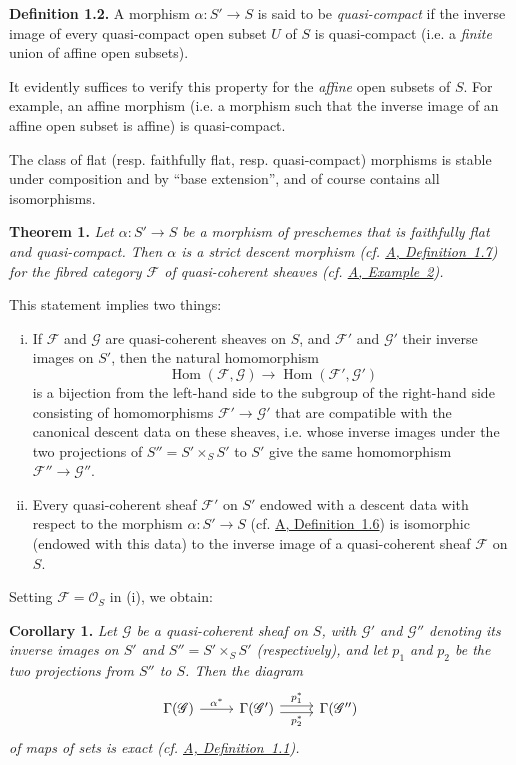 \documentclass{article}
\newenvironment{itenv}[1]
  {\phantomsection\par\medskip\noindent\textbf{#1.}\itshape}
  {\medskip}
\newenvironment{rmenv}[1]
  {\phantomsection\par\medskip\noindent\textbf{#1.}\rmfamily}
  {\medskip}
\newcommand{\scr}[1]{{\mathscr{#1}}}
\renewcommand{\cal}[1]{{\mathcal{#1}}}
\DeclareMathOperator{\Hom}{Hom}
\newcommand{\oldpage}[1]{\marginpar{\footnotesize$\Big\vert$ \textit{p.~#1}}}
\begin{document}
\begin{rmenv}{Definition 1.2}
  A morphism $\alpha\colon S'\to S$ is said to be \emph{quasi-compact} if the inverse image of every quasi-compact open subset $U$ of $S$ is quasi-compact (i.e. a \emph{finite} union of affine open subsets).
\end{rmenv}

It evidently suffices to verify this property for the \emph{affine} open subsets of $S$.
For example, an affine morphism (i.e. a morphism such that the inverse image of an affine open subset is affine) is quasi-compact.

The class of flat (resp. faithfully flat, resp. quasi-compact) morphisms is stable under composition and by ``base extension'', and of course contains all isomorphisms.

\begin{itenv}{Theorem 1}
\label{theorem:B.1(1)}
  Let $\alpha\colon S'\to S$ be a morphism of preschemes that is \emph{faithfully flat} and \emph{quasi-compact}.
  Then $\alpha$ is a \emph{strict descent morphism} (cf. \hyperref[definition:A.1.7]{A, Definition~1.7}) for the fibred category $\cal{F}$ of quasi-coherent sheaves (cf. \hyperref[example:A.1.1(2)]{A, Example~2}).
\end{itenv}

This statement implies two things:
\begin{enumerate}[(i)]
  \item If $\cal{F}$ and $\scr{G}$ are quasi-coherent sheaves on $S$, and $\cal{F}'$ and $\scr{G}'$ their inverse images on $S'$, then the natural homomorphism
    \[
      \Hom(\cal{F},\scr{G}) \to \Hom(\cal{F}',\scr{G}')
    \]
    is a bijection from the left-hand side to the subgroup of the right-hand side consisting of homomorphisms $\cal{F}'\to\scr{G}'$ that are compatible with the canonical descent data on these sheaves, i.e. whose inverse images under the two projections of $S''=S'\times_S S'$ to $S'$ give the same homomorphism $\cal{F}''\to\scr{G}''$.
  \item Every quasi-coherent sheaf $\cal{F}'$ on $S'$ endowed with a descent data with respect to the morphism $\alpha\colon S'\to S$ (cf. \hyperref[definition:A.1.6]{A, Definition~1.6}) is isomorphic (endowed with this data) to the inverse image of a quasi-coherent sheaf $\cal{F}$ on $S$.
\end{enumerate}

Setting $\cal{F}=\scr{O}_S$ in (i), we obtain:

\begin{itenv}{Corollary 1}
\label{corollary:B.1(1)}
  Let $\scr{G}$ be a quasi-coherent sheaf on $S$, with $\scr{G}'$ and $\scr{G}''$ denoting its inverse images on $S'$ and $S''=S'\times_S S'$ (respectively), and let $p_1$ and $p_2$ be the two projections from $S''$ to $S$.
  Then the diagram
\oldpage{190-18}
  \[
    \begin{tikzcd}
      \Gamma(\scr{G}) \rar["\alpha^*"]
      & \Gamma(\scr{G}') \rar[shift left=1,"p_1^*"] \rar[shift right=1,swap,"p_2^*"]
      & \Gamma(\scr{G}'')
    \end{tikzcd}
  \]
  of maps of sets is \emph{exact} (cf. \hyperref[definition:A.1.1]{A, Definition~1.1}).
\end{itenv}
\end{document}
